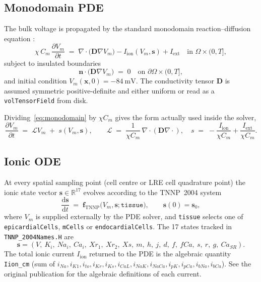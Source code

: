 \documentclass[11pt,a4paper]{article}
\newcommand{\Vm}{V_{m}}
\newcommand{\Iion}{I_{\text{ion}}}
\newcommand{\Iext}{I_{\text{ext}}}
\newcommand{\Dten}{\mathbf{D}}
\newcommand{\grad}{\nabla}
\newcommand{\divg}{\nabla\!\cdot}
\newcommand{\code}[1]{\texttt{\small #1}}
\begin{document}
\subsection{Monodomain PDE}

The bulk voltage is propagated by the standard monodomain reaction--diffusion
equation \cite{ttp2004,niederer2012}:
\begin{equation}
  \chi \, C_{m} \, \frac{\partial \Vm}{\partial t}
   \;=\;
   \divg\!\bigl( \Dten \grad \Vm \bigr)
   - \Iion(\Vm, \mathbf{s})
   + \Iext
   \quad \text{in } \Omega \times (0, T],
   \label{eq:monodomain}
\end{equation}
subject to insulated boundaries
\begin{equation}
  \mathbf{n} \cdot \bigl(\Dten \grad \Vm\bigr) \;=\; 0
   \quad \text{on } \partial\Omega \times (0, T],
\end{equation}
and initial condition $\Vm(\mathbf{x}, 0) = -\SI{84}{\milli\volt}$.
The conductivity tensor $\Dten$ is assumed symmetric positive-definite
and either uniform or read as a \code{volTensorField} from disk.

Dividing~\eqref{eq:monodomain} by $\chi C_{m}$ gives the form actually
used inside the solver,
\begin{equation}
  \frac{\partial \Vm}{\partial t}
   \;=\;
   \mathcal{L} \Vm
   \;+\;
   s(\Vm, \mathbf{s}),
   \qquad
   \mathcal{L} \;=\; \frac{1}{\chi C_{m}}\,\divg(\Dten \grad \cdot),
   \quad
   s \;=\; -\frac{\Iion}{\chi C_{m}} + \frac{\Iext}{\chi C_{m}}.
   \label{eq:semi-discrete}
\end{equation}

\subsection{Ionic ODE}

At every spatial sampling point (cell centre or LRE cell quadrature
point) the ionic state vector $\mathbf{s} \in \mathbb{R}^{17}$ evolves
according to the TNNP~2004 system
\begin{equation}
  \frac{\mathrm{d}\mathbf{s}}{\mathrm{d}t}
   \;=\;
   \mathbf{f}_{\text{TNNP}}\!\bigl(\Vm, \mathbf{s}; \texttt{tissue}\bigr),
   \qquad \mathbf{s}(0) = \mathbf{s}_{0},
   \label{eq:tnnp}
\end{equation}
where $\Vm$ is supplied externally by the PDE solver, and
\code{tissue} selects one of \code{epicardialCells},
\code{mCells} or \code{endocardialCells}. The 17 states tracked in
\code{TNNP\_2004Names.H} are
\[
  \mathbf{s} = (V,\ K_{i},\ Na_{i},\ Ca_{i},\ Xr_{1},\ Xr_{2},\ Xs,\ m,\ h,\ j,\ d,\ f,\ fCa,\ s,\ r,\ g,\ Ca_{SR}).
\]
The total ionic current $\Iion$ returned to the PDE is the algebraic
quantity \code{Iion\_cm} (sum of $i_{Na}, i_{K1}, i_{to}, i_{Kr},
i_{Ks}, i_{CaL}, i_{NaK}, i_{NaCa}, i_{pK}, i_{pCa}, i_{bNa},
i_{bCa}$). See the original publication \cite{ttp2004} for the
algebraic definitions of each current.
\end{document}
